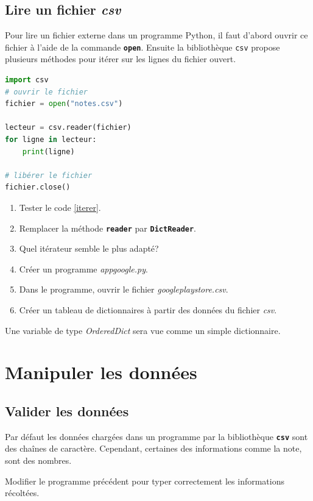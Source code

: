 \documentclass[a4paper,11pt]{article}
\begin{document}
\subsection{Lire un fichier \emph{csv}}
Pour lire un fichier externe dans un programme Python, il faut d'abord ouvrir ce fichier à l'aide de la commande \textbf{\texttt{open}}. Ensuite la bibliothèque \texttt{csv} propose plusieurs méthodes pour itérer sur les lignes du fichier ouvert.
\begin{center}
    \begin{lstlisting}[language=Python]
import csv
# ouvrir le fichier
fichier = open("notes.csv")

lecteur = csv.reader(fichier)
for ligne in lecteur:
    print(ligne)

# libérer le fichier
fichier.close()
\end{lstlisting}
    \label{iterer}
\end{center}
\begin{activite}
    \begin{enumerate}
        \item Tester le code \ref{iterer}.
        \item Remplacer la méthode \textbf{\texttt{reader}} par \textbf{\texttt{DictReader}}.
        \item Quel itérateur semble le plus adapté?
        \item Créer un programme \emph{appgoogle.py}.
        \item Dans le programme, ouvrir le fichier \emph{googleplaystore.csv}.
        \item Créer un tableau de dictionnaires à partir des données du fichier \emph{csv}.
    \end{enumerate}
\end{activite}
\begin{aretenir}[Commentaire]
    Une variable de type \emph{OrderedDict} sera vue comme un simple dictionnaire.
\end{aretenir}
\section{Manipuler les données}
\subsection{Valider les données}
Par défaut les données chargées dans un programme par la bibliothèque \textbf{\texttt{csv}} sont des chaînes de caractère. Cependant, certaines des informations comme la note, sont des nombres.
\begin{activite}
    Modifier le programme précédent pour typer correctement les informations récoltées.
\end{activite}
\end{document}
